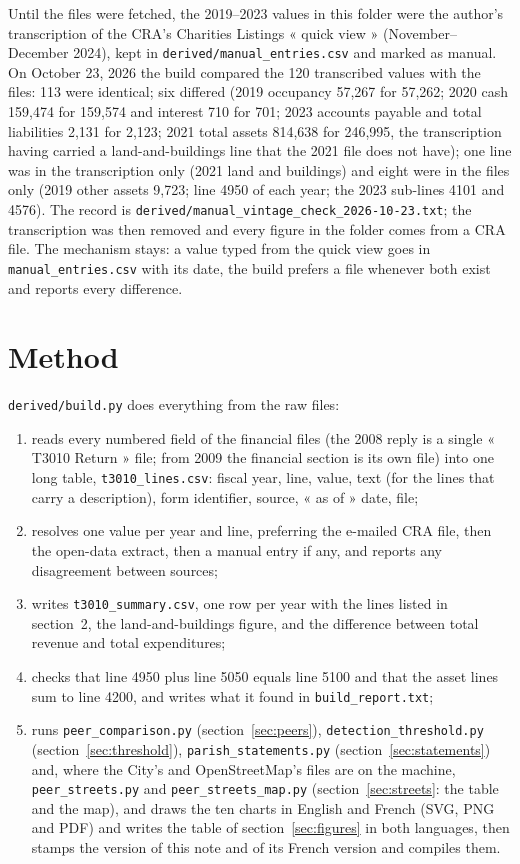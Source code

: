 \documentclass[11pt,letterpaper]{article}
\begin{document}
Until the files were fetched, the 2019--2023 values in this folder were the author's transcription of the CRA's Charities Listings « quick view » (November--December 2024), kept in \texttt{derived/manual\_entries.csv} and marked as manual. On October 23, 2026 the build compared the 120 transcribed values with the files: 113 were identical; six differed (2019 occupancy 57,267 for 57,262; 2020 cash 159,474 for 159,574 and interest 710 for 701; 2023 accounts payable and total liabilities 2,131 for 2,123; 2021 total assets 814,638 for 246,995, the transcription having carried a land-and-buildings line that the 2021 file does not have); one line was in the transcription only (2021 land and buildings) and eight were in the files only (2019 other assets 9,723; line 4950 of each year; the 2023 sub-lines 4101 and 4576). The record is \texttt{derived/manual\_vintage\_check\_2026-10-23.txt}; the transcription was then removed and every figure in the folder comes from a CRA file. The mechanism stays: a value typed from the quick view goes in \texttt{manual\_entries.csv} with its date, the build prefers a file whenever both exist and reports every difference.

\section{Method}\label{sec:method}

\texttt{derived/build.py} does everything from the raw files:
\begin{enumerate}[nosep,leftmargin=1.6em]
\item reads every numbered field of the financial files (the 2008 reply is a single « T3010 Return » file; from 2009 the financial section is its own file) into one long table, \texttt{t3010\_lines.csv}: fiscal year, line, value, text (for the lines that carry a description), form identifier, source, « as of » date, file;
\item resolves one value per year and line, preferring the e-mailed CRA file, then the open-data extract, then a manual entry if any, and reports any disagreement between sources;
\item writes \texttt{t3010\_summary.csv}, one row per year with the lines listed in section~2, the land-and-buildings figure, and the difference between total revenue and total expenditures;
\item checks that line 4950 plus line 5050 equals line 5100 and that the asset lines sum to line 4200, and writes what it found in \texttt{build\_report.txt};
\item runs \texttt{peer\_comparison.py} (section~\ref{sec:peers}), \texttt{detection\_threshold.py} (section~\ref{sec:threshold}), \texttt{parish\_statements.py} (section~\ref{sec:statements}) and, where the City's and OpenStreetMap's files are on the machine, \texttt{peer\_streets.py} and \texttt{peer\_streets\_map.py} (section~\ref{sec:streets}: the table and the map), and draws the ten charts in English and French (SVG, PNG and PDF) and writes the table of section~\ref{sec:figures} in both languages, then stamps the version of this note and of its French version and compiles them.
\end{enumerate}
\end{document}
